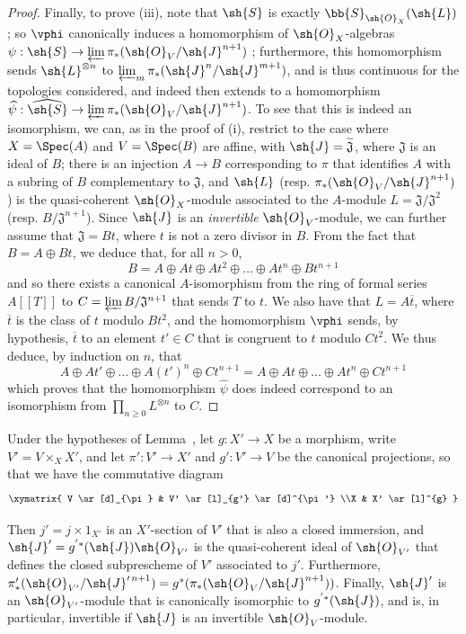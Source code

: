 \begin{proof}
Finally, to prove (iii), note that $\sh{S}$ is exactly $\bb{S}_{\sh{O}_X}(\sh{L})$;
so $\vphi$ canonically induces a homomorphism of $\sh{O}_X$-algebras $\psi:\sh{S}\to\varprojlim\pi_*(\sh{O}_V/\sh{J}^{n+1})$ ;
  furthermore, this homomorphism sends $\sh{L}^{\otimes n}$ to $\varprojlim_m\pi_*(\sh{J}^n/\sh{J}^{m+1})$, and is thus continuous for the topologies considered, and indeed then extends to a homomorphism $\widehat{\psi}:\widehat{\sh{S}}\to\varprojlim\pi_*(\sh{O}_V/\sh{J}^{n+1})$.
To see that this is indeed an isomorphism, we can, as in the proof of (i), restrict to the case where $X=\Spec(A)$ and $V=\Spec(B)$ are affine, with $\sh{J}=\widetilde{\mathfrak{J}}$, where $\mathfrak{J}$ is an ideal of $B$;
  there is an injection $A\to B$ corresponding to $\pi$ that identifies $A$ with a subring of $B$ complementary to $\mathfrak{J}$, and $\sh{L}$ (resp. $\pi_*(\sh{O}_V/\sh{J}^{n+1})$) is the quasi-coherent $\sh{O}_X$-module associated to the $A$-module $L=\mathfrak{J}/\mathfrak{J}^2$ (resp. $B/\mathfrak{J}^{n+1}$).
Since $\sh{J}$ is an \emph{invertible} $\sh{O}_V$-module, we can further assume that $\mathfrak{J}=Bt$, where $t$ is not a zero divisor in $B$.
From the fact that $B=A\oplus Bt$, we deduce that, for all $n>0$,
\[
  B = A \oplus At \oplus At^2 \oplus \ldots \oplus At^n \oplus Bt^{n+1}
\]
and so there exists a canonical $A$-isomorphism from the ring of formal series $A[[T]]$ to $C=\varprojlim B/\mathfrak{J}^{n+1}$ that sends $T$ to $t$.
We also have that $L=A\overline{t}$, where $\overline{t}$ is the class of $t$ modulo $Bt^2$, and the homomorphism $\vphi$ sends, by hypothesis, $\overline{t}$ to an element $t'\in C$ that is congruent to $t$ modulo $Ct^2$.
We thus deduce, by induction on $n$, that
\[
  A \oplus At' \oplus \ldots \oplus A(t')^n \oplus Ct^{n+1}
  =
  A \oplus At \oplus \ldots \oplus At^n \oplus Ct^{n+1}
\]
which proves that the homomorphism $\widehat{\psi}$ does indeed correspond to an isomorphism from $\prod_{n\geq0}L^{\otimes n}$ to $C$.
\end{proof}

\begin{lemma}[8.10.2]
\label{II.8.10.2}
Under the hypotheses of Lemma~, let $g:X'\to X$ be a morphism,
write $V'=V\times_X X'$, and let $\pi':V'\to X'$ and $g':V'\to V$ be the canonical projections, so that we have the commutative diagram
\[
  \xymatrix{
    V
      \ar[d]_{\pi}
  & V'
      \ar[l]_{g'}
      \ar[d]^{\pi'}
  \\X
  & X'
      \ar[l]^{g}
  }
\]

Then $j'=j\times1_{X'}$ is an $X'$-section of $V'$ that is also a closed immersion, and $\sh{J}'=g^{'*}(\sh{J})\sh{O}_{V'}$ is the quasi-coherent ideal of $\sh{O}_{V'}$ that defines the closed subprescheme of $V'$ associated to $j'$.
Furthermore, $\pi'_*(\sh{O}_{V'}/\sh{J}'^{\,n+1}) = g^*(\pi_*(\sh{O}_V/\sh{J}^{n+1}))$.
Finally, $\sh{J}'$ is an $\sh{O}_{V'}$-module that is canonically isomorphic to $g^{'*}(\sh{J})$, and is, in particular, invertible if $\sh{J}$ is an invertible $\sh{O}_V$-module.
\end{lemma}

